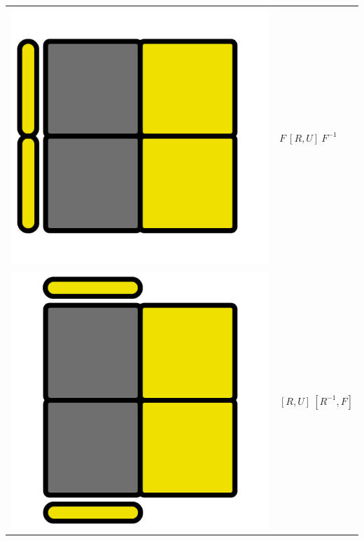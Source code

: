 \documentclass[12pt,a4paper, usenames, dvipsnames]{article}
\theoremstyle{mystyle}
\theoremstyle{definition}
\begin{document}
\begin{center}
\begin{tabular}{m{4cm} m{6cm}}
\includegraphics[scale=0.08]{TOPVIEW4.png} & $F \ [ R,U ] \ F^{-1}$ \\
\includegraphics[scale=0.08]{TOPVIEW5.png} & $[ R,U ] \ [R^{-1}, F]$ \\
\bottomrule
\end{tabular}
\end{center}
\end{document}
